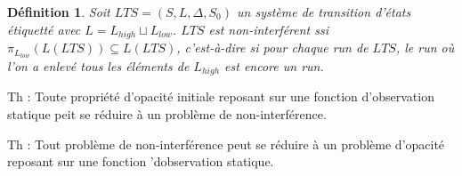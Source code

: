 \documentclass[10pt,a4paper]{article}
\newtheorem {mydef} {D\'efinition}
\begin{document}
\begin{mydef}
  Soit $LTS = (S,L,\Delta,S_0)$ un syst\`eme de transition d'\'etats \'etiquett\'e avec $L=L_{high}\sqcup L_{low}$. $LTS$ est non-interf\'erent ssi $\pi_{L_{low}}(L(LTS)) \subseteq L(LTS)$, c'est-\`a-dire si pour chaque run de $LTS$, le run o\`u l'on a enlev\'e tous les \'el\'ements de $L_{high}$ est encore un run.
\end{mydef}

Th : Toute propri\'et\'e d'opacit\'e initiale reposant sur une fonction d'observation statique peit se r\'eduire \`a un probl\`eme  de non-interf\'erence.

Th : Tout probl\`eme de non-interf\'erence peut se r\'eduire \`a un probl\`eme d'opacit\'e reposant sur une fonction 'dobservation statique.
\end{document}
